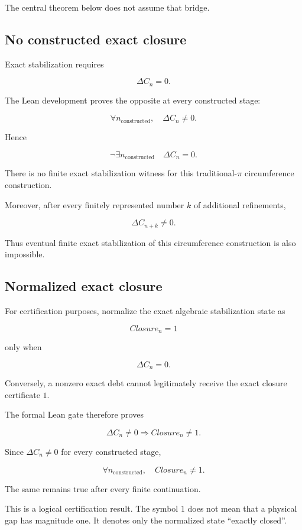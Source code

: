 \documentclass[11pt,a4paper]{article}
\begin{document}
The central theorem below does not assume that bridge.

\subsection{No constructed exact closure}

Exact stabilization requires

\[
\Delta C_n=0.
\]

The Lean development proves the opposite at every constructed stage:

\[
\boxed{
\forall n_{\mathrm{constructed}},
\quad
\Delta C_n\neq0.
}
\]

Hence

\[
\boxed{
\neg\exists n_{\mathrm{constructed}}
\quad
\Delta C_n=0.
}
\]

There is no finite exact stabilization witness for this traditional-\(\pi\) circumference construction.

Moreover, after every finitely represented number \(k\) of additional
refinements,

\[
\boxed{
\Delta C_{n+k}\neq0.
}
\]

Thus eventual finite exact stabilization of this circumference construction is also impossible.

\subsection{Normalized exact closure}

For certification purposes, normalize the exact algebraic stabilization state as

\[
Closure_n=1
\]

only when

\[
\Delta C_n=0.
\]

Conversely, a nonzero exact debt cannot legitimately receive the exact
closure certificate \(1\).

The formal Lean gate therefore proves

\[
\boxed{
\Delta C_n\neq0
\Longrightarrow
Closure_n\neq1.
}
\]

Since \(\Delta C_n\neq0\) for every constructed stage,

\[
\boxed{
\forall n_{\mathrm{constructed}},
\quad
Closure_n\neq1.
}
\]

The same remains true after every finite continuation.

This is a logical certification result. The symbol \(1\) does not mean
that a physical gap has magnitude one. It denotes only the normalized
state ``exactly closed''.
\end{document}

